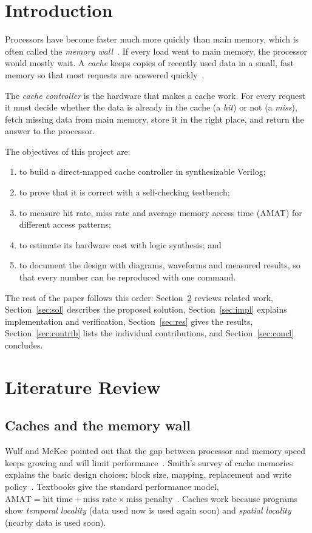 \documentclass[conference]{IEEEtran}
\begin{document}
\section{Introduction}
Processors have become faster much more quickly than main memory, which is often called the \emph{memory wall}~\cite{wulf1995}. If every load went to main memory, the processor would mostly wait. A \emph{cache} keeps copies of recently used data in a small, fast memory so that most requests are answered quickly~\cite{smith1982,hennessy2017}.

The \emph{cache controller} is the hardware that makes a cache work. For every request it must decide whether the data is already in the cache (a \emph{hit}) or not (a \emph{miss}), fetch missing data from main memory, store it in the right place, and return the answer to the processor.

The objectives of this project are:
\begin{enumerate}
\item to build a direct-mapped cache controller in synthesizable Verilog;
\item to prove that it is correct with a self-checking testbench;
\item to measure hit rate, miss rate and average memory access time (AMAT) for different access patterns;
\item to estimate its hardware cost with logic synthesis; and
\item to document the design with diagrams, waveforms and measured results, so that every number can be reproduced with one command.
\end{enumerate}
The rest of the paper follows this order: Section~\ref{sec:lit} reviews related work, Section~\ref{sec:sol} describes the proposed solution, Section~\ref{sec:impl} explains implementation and verification, Section~\ref{sec:res} gives the results, Section~\ref{sec:contrib} lists the individual contributions, and Section~\ref{sec:concl} concludes.

\section{Literature Review}\label{sec:lit}
\subsection{Caches and the memory wall}
Wulf and McKee pointed out that the gap between processor and memory speed keeps growing and will limit performance~\cite{wulf1995}. Smith's survey of cache memories explains the basic design choices: block size, mapping, replacement and write policy~\cite{smith1982}. Textbooks give the standard performance model, $\text{AMAT}=\text{hit time}+\text{miss rate}\times\text{miss penalty}$~\cite{hennessy2017,patterson2020}. Caches work because programs show \emph{temporal locality} (data used now is used again soon) and \emph{spatial locality} (nearby data is used soon).
\end{document}
